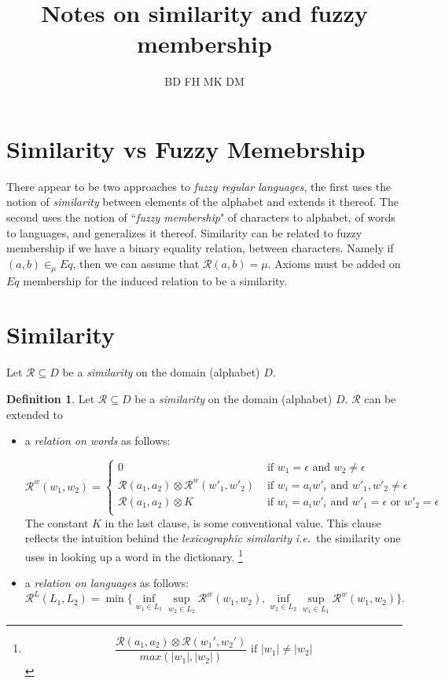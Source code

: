 \documentclass{article}
\title{Notes on similarity and fuzzy membership}
\author{BD FH MK DM }
\theoremstyle{proposition}
\theoremstyle{definition}%
\newtheorem{definition}{Definition}%
\newcommand {\ie}{{\em i.e.}}
\begin{document}
\maketitle

\section{Similarity vs Fuzzy Memebrship}
There appear to be two approaches to {\em fuzzy regular languages}, the first uses the notion of {\em similarity} between elements of the alphabet and extends it thereof. The second uses the notion of ``{\em fuzzy membership}" of characters to alphabet, of words to languages, and generalizes it thereof. 
Similarity can be related to fuzzy membership if we have a binary equality relation, between characters. Namely if $(a,b)\in_\mu Eq$, then we can assume that ${\mathcal R}(a,b)=\mu$. Axioms must be added on $Eq$ membership for the induced relation to be a similarity. 

\section{Similarity}

Let ${\mathcal R}\subseteq D$ be a {\em similarity} on the domain (alphabet) $D$.

\begin{definition}\label{ext}Let ${\mathcal R}\subseteq D$ be a {\em similarity} on the domain (alphabet) $D$. ${\mathcal R}$ can be extended to \begin{itemize}
\item a {\em  relation on words} as follows:
 

${\mathcal R}^w(w_1,w_2) = \begin{cases} 0 & \mbox{ if } w_1= \epsilon \mbox{ and } w_2\neq \epsilon \\
{\mathcal R}(a_1,a_2)\otimes {\mathcal R}^w(w'_1,w'_2) & \mbox{ if }w_i=a_iw'_i \mbox{ and  } w'_1, w'_2\neq \epsilon\\
{\mathcal R}(a_1,a_2)\otimes K & \mbox{ if }w_i=a_iw'_i \mbox{ and  } w'_1= \epsilon \mbox{ or } w'_2 = \epsilon\\
\end{cases}$
\noindent The constant $K$  in the last clause, is some conventional value. This clause reflects the intuition behind the {\em lexicographic similarity} \ie\ the similarity one uses in looking up a word in the dictionary. 
\footnote{$$\frac{\mathcal{R}(a_1,a_2)\otimes\mathcal{R}(w_1',w_2')}{max(|w_1|,|w_2|)}  \mbox{ if }|w_1|\neq |w_2|
$$}
\item a {\em  relation on languages} as follows:
$${\mathcal R}^L(L_1,L_2)= \min\{\inf_{w_1\in L_1}\sup_{w_2\in L_2}{\mathcal R}^w(w_1,w_2),\inf_{w_2\in L_2}\sup_{w_1\in L_1}{\mathcal R}^w(w_1,w_2)\}.$$
\end{itemize}
\end{definition}
\end{document}
